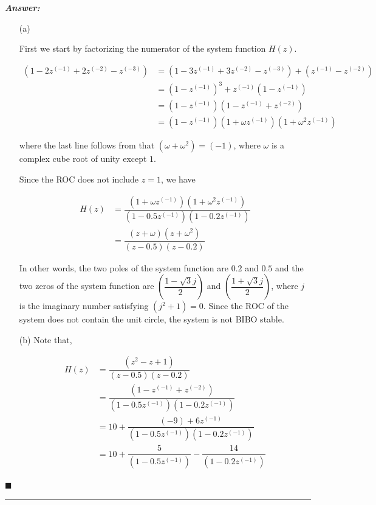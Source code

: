 \documentclass[12pt]{article}
\theoremstyle{definition}
\newenvironment{answer}{
    \textbf{\textit{Answer:}} \qquad
}{\hfill $\blacksquare$ \\ 

\begin{center}
    \rule{0.8\linewidth}{1.5px} 
    \vspace*{1cm}   
\end{center}
}
\newcommand{\inv}[1][1]{^{(- #1)}}
\begin{document}
\begin{answer}
    \begin{enumerate}
        \item[(a)]
        
        First we start by factorizing the numerator of the system function $H(z)$.

        \begin{align*}
            (1 - 2z\inv + 2z\inv[2] - z\inv[3])
            & = (1 - 3z\inv + 3z\inv[2] - z\inv[3]) + (z\inv - z\inv[2])\\
            & = (1 - z\inv)^3 + z\inv (1 - z\inv)\\
            & = (1 - z\inv) (1 - z\inv + z\inv[2])\\
            & = (1 - z\inv)(1 + \omega z\inv)(1 + \omega^2 z\inv)        
        \end{align*}

        where the last line follows from that $(\omega + \omega^2) = (-1)$, where $\omega$ is a complex cube root of unity except $1$.

        Since the ROC does not include $z = 1$, we have

        \begin{align*}
            H(z) 
            & = \dfrac{(1 + \omega z\inv)(1 + \omega^2 z\inv)}{(1 - 0.5z\inv)(1 - 0.2z\inv)}\\
            & = \dfrac{(z + \omega)(z + \omega^2)}{(z - 0.5)(z - 0.2)}            
        \end{align*}

        In other words, the two poles of the system function are $0.2$ and $0.5$ and the two zeros of the system function are $\left( \dfrac{1 - \sqrt{3}j }{2} \right)$ and $\left( \dfrac{1 + \sqrt{3}j }{2} \right)$, where $j$ is the imaginary number satisfying $(j^2 + 1) = 0$. Since the ROC of the system does not contain the unit circle, the system is not BIBO stable.

        \item[(b)] Note that, 
        
        \begin{align*}
            H(z) 
            & = \dfrac{(z^2 - z + 1)}{(z - 0.5)(z - 0.2)}\\
            & = \dfrac{(1 - z\inv + z\inv[2])}{(1 - 0.5 z\inv)(1 - 0.2z\inv)}\\
            & = 10 + \dfrac{(-9) + 6z\inv}{(1 - 0.5z\inv)(1 - 0.2z\inv)}\\
            & = 10 + \dfrac{5}{(1 - 0.5z\inv)} - \dfrac{14}{(1 - 0.2z\inv)}
        \end{align*}


\end{enumerate}
\end{answer}
\end{document}
